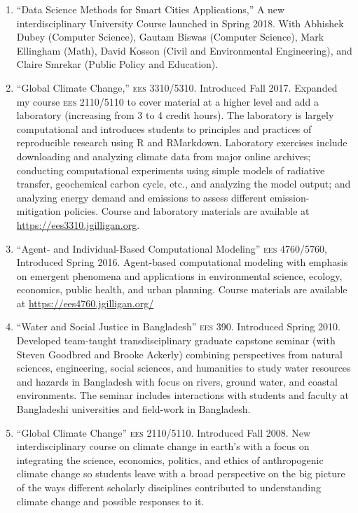 %
%
\begin{enumerate}
\item ``Data Science Methods for Smart Cities Applications,'' A new interdisciplinary University Course launched in Spring 2018. With Abhishek Dubey (Computer Science), Gautam Biswas (Computer Science), Mark Ellingham (Math), David Kosson (Civil and Environmental Engineering), and Claire Smrekar (Public Policy and Education). 
\item ``Global Climate Change,'' \textsc{ees 3310/5310}. Introduced Fall 2017. Expanded my course \textsc{ees 2110/5110} to cover material at a higher level and add a laboratory (increasing from 3 to 4 credit hours).
The laboratory is largely computational and introduces students to principles and practices of reproducible research using R and RMarkdown. Laboratory exercises include downloading and analyzing climate data
from major online archives; conducting computational experiments using simple models of radiative transfer, geochemical carbon cycle, etc., and analyzing the model output; and analyzing energy demand and  emissions to assess different emission-mitigation policies. Course and laboratory materials are available at \url{https://ees3310.jgilligan.org}.
\item ``Agent- and Individual-Based Computational Modeling'' \textsc{ees 4760/5760}, Introduced Spring 2016. Agent-based computational modeling with emphasis on emergent phenomena and applications in environmental science, ecology, economics, public health, and urban planning. Course materials are available at \url{https://ees4760.jgilligan.org/}
\item ``Water and Social Justice in Bangladesh'' \textsc{ees 390}. Introduced Spring 2010. Developed team-taught transdisciplinary graduate capstone seminar (with Steven Goodbred and Brooke Ackerly) combining perspectives from natural sciences, engineering, social sciences, and humanities to study water resources and hazards in Bangladesh with focus on rivers, ground water, and coastal environments. The seminar includes interactions with students and faculty at Bangladeshi universities and field-work in Bangladesh.
\item ``Global Climate Change'' \textsc{ees 2110/5110}. Introduced Fall 2008. New interdisciplinary course on climate change in earth's with a focus on integrating the science, economics, politics, and ethics of anthropogenic climate change so students leave with a broad perspective on the big picture of the ways different scholarly disciplines contributed to understanding climate change and possible responses to it.

\end{enumerate}
